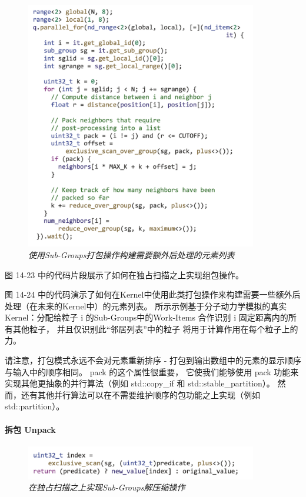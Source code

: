 \begin{figure}[H]
	\centering
	\includegraphics[width=0.9\textwidth]{figs/F14.24.png}
	\caption{\textit{使用Sub-Groups打包操作构建需要额外后处理的元素列表 }}
\end{figure}

图 14-23 中的代码片段展示了如何在独占扫描之上实现组包操作。

图 14-24 中的代码演示了如何在Kernel中使用此类打包操作来构建需要一些额外后处理（在未来的Kernel中）的元素列表。 
所示示例基于分子动力学模拟的真实Kernel：分配给粒子 i 的Sub-Groups中的Work-Items
合作识别 i 固定距离内的所有其他粒子，
并且仅识别此“邻居列表”中的粒子 将用于计算作用在每个粒子上的力。

请注意，打包模式永远不会对元素重新排序 - 打包到输出数组中的元素的显示顺序与输入中的顺序相同。 
pack 的这个属性很重要，
它使我们能够使用 pack 功能来实现其他更抽象的并行算法（例如 std::copy\_if 和 std::stable\_partition）。 
然而，还有其他并行算法可以在不需要维护顺序的包功能之上实现（例如 std::partition）。

\paragraph{拆包 Unpack}

\begin{figure}[H]
	\centering
	\includegraphics[width=0.9\textwidth]{figs/F14.25.png}
	\caption{\textit{在独占扫描之上实现Sub-Groups解压缩操作 }}
\end{figure}

